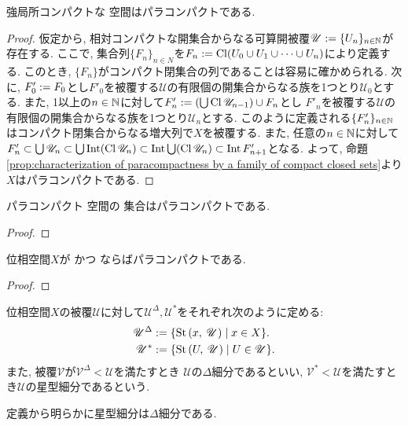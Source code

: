 \documentclass[uplatex, dvipdfmx, a4paper, 12pt, class=jsbook, crop=false]{standalone}
\begin{document}
\begin{proposition}
	強局所コンパクトな \Lindelof 空間はパラコンパクトである.
\end{proposition}

\begin{proof}
	仮定から, 相対コンパクトな開集合からなる可算開被覆$ \mathscr{U} \mathrel{:=} \{U_n\}_{n \in \mathbb{N}} $が存在する.
	ここで, 集合列$ \{F_n\}_{n \in N} $を$ F_n \mathrel{:=} \mathop{\mathrm{Cl}}\nolimits (U_0 \cup U_1 \cup \cdots \cup U_n) $により定義する.
	このとき, $ \{F_n\} $がコンパクト閉集合の列であることは容易に確かめられる.
	次に, $ F'_0 \mathrel{:=} F_0 $とし$ F'_0 $を被覆する$ \mathscr{U} $の有限個の開集合からなる族を1つとり$ \mathscr{U}_0 $とする.
	また, 1以上の$ n \in \mathbb{N} $に対して$ F'_n \mathrel{:=} \left(\bigcup \mathop{\mathrm{Cl}}\nolimits \mathscr{U}_{n-1} \right) \cup F_n $とし
	$ F'_n $を被覆する$ \mathscr{U} $の有限個の開集合からなる族を1つとり$ \mathscr{U}_n $とする.
	このように定義される$ \{F'_n\}_{n \in \mathbb{N}} $はコンパクト閉集合からなる増大列で$ X $を被覆する.
	また, 任意の$ n \in \mathbb{N} $に対して$ F'_n \subset \bigcup \mathscr{U}_n  \subset \bigcup \mathop{\mathrm{Int}}\nolimits (\mathop{\mathrm{Cl}}\nolimits \mathscr{U}_n)
	\subset \mathop{\mathrm{Int}}\nolimits \bigcup (\mathop{\mathrm{Cl}}\nolimits \mathscr{U}_n) \subset \mathop{\mathrm{Int}}\nolimits F'_{n+1} $となる.
	よって, 命題\ref{prop:characterization of paracompactness by a family of compact closed sets}より$ X $はパラコンパクトである.
\end{proof}

\begin{proposition}
	パラコンパクト \Hausdorff 空間の \Fsigma 集合はパラコンパクトである.
\end{proposition}
\begin{proof}
	\WIP
\end{proof}

\begin{theorem}
	位相空間$ X $が  かつ \Lindelof ならばパラコンパクトである.
\end{theorem}
\begin{proof}
	\WIP
\end{proof}

\begin{definition}
	位相空間$ X $の被覆$ \mathscr{U} $に対して$ \mathscr{U}^\Delta, \mathscr{U}^* $をそれぞれ次のように定める:
	\begin{align*}
		\mathscr{U}^\Delta & \defeq \setcomp{\starset{x}{\mathscr{U}}}{x \in X}. \\
		\mathscr{U}^* & \defeq \setcomp{\starset{U}{\mathscr{U}}}{U \in \mathscr{U}}.
	\end{align*}
	また, 被覆$ \mathscr{V} $が$ \mathscr{V}^\Delta < \mathscr{U} $を満たすとき
	$ \mathscr{U} $の$ \Delta $細分であるといい,
	$ \mathscr{V}^* < \mathscr{U} $を満たすとき$ \mathscr{U} $の星型細分であるという.
\end{definition}
定義から明らかに星型細分は$ \Delta $細分である.
\end{document}
